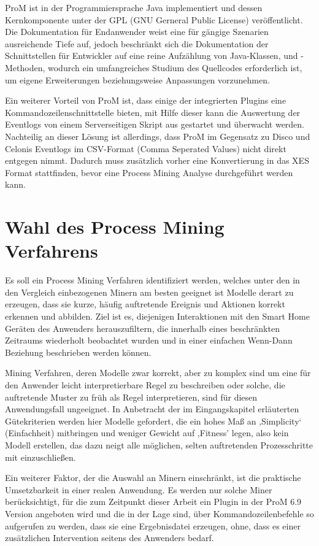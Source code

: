ProM ist in der Programmiersprache Java implementiert und dessen Kernkomponente unter der GPL (GNU  Gerneral Public License) veröffentlicht. Die Dokumentation für Endanwender weist eine für gängige Szenarien ausreichende Tiefe auf, jedoch beschränkt sich die Dokumentation der Schnittstellen für Entwickler auf eine reine Aufzählung von Java-Klassen, und -Methoden, wodurch ein umfangreiches Studium des Quellcodes erforderlich ist, um eigene Erweiterungen beziehungsweise Anpassungen vorzunehmen.

Ein weiterer Vorteil von ProM ist, dass einige der integrierten Plugins eine Kommandozeilenschnittstelle bieten, mit Hilfe dieser kann die Auswertung der Eventlogs von einem Serverseitigen Skript aus gestartet und überwacht werden. Nachteilig an dieser Lösung ist allerdings, dass ProM im Gegensatz zu Disco und Celonis Eventlogs im CSV-Format (Comma Seperated Values) nicht direkt entgegen nimmt. Dadurch muss zusätzlich vorher eine Konvertierung in das XES Format stattfinden, bevor eine Process Mining Analyse durchgeführt werden kann.

\section{Wahl des Process Mining Verfahrens}

Es soll ein Process Mining Verfahren identifiziert werden, welches unter den in den Vergleich einbezogenen Minern am besten geeignet ist Modelle derart zu erzeugen, dass sie kurze, häufig auftretende Ereignis und Aktionen korrekt erkennen und abbilden. Ziel ist es, diejenigen Interaktionen mit den Smart Home Geräten des Anwenders herauszufiltern, die innerhalb eines beschränkten Zeitraums wiederholt beobachtet wurden und in einer einfachen Wenn-Dann Beziehung beschrieben werden können. 

Mining Verfahren, deren Modelle zwar korrekt, aber zu komplex sind um eine für den Anwender leicht interpretierbare Regel zu beschreiben oder solche, die auftretende Muster zu früh als Regel interpretieren, sind für diesen Anwendungsfall ungeeignet. In Anbetracht der im Eingangskapitel erläuterten Gütekriterien werden hier Modelle gefordert, die ein hohes Maß an ‚Simplicity‘ (Einfachheit) mitbringen und weniger Gewicht auf ,Fitness' legen, also kein Modell erstellen, das dazu neigt alle möglichen, selten auftretenden Prozesschritte mit einzuschließen. 

Ein weiterer Faktor, der die Auswahl an Minern einschränkt, ist die praktische Umsetzbarkeit in einer realen Anwendung. Es werden nur solche Miner berücksichtigt, für die zum Zeitpunkt dieser Arbeit ein Plugin in der ProM 6.9 Version angeboten wird und die in der Lage sind, über Kommandozeilenbefehle so aufgerufen zu werden, dass sie eine Ergebnisdatei erzeugen, ohne, dass es einer zusätzlichen Intervention seitens des Anwenders bedarf.

